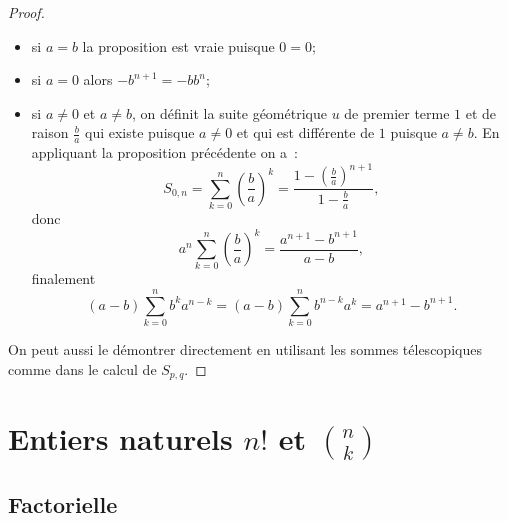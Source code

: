 \begin{proof}
  \begin{itemize}
  \item si \(a=b\) la proposition est vraie puisque \(0=0\);
  \item si \(a=0\) alors \(-b^{n+1}=-b b^n\);
  \item si \(a\neq 0\) et \(a\neq b\), on définit la suite géométrique \(u\) de premier terme \(1\) et de raison \(\frac{b}{a}\) qui existe puisque \(a\neq 0\) et qui est différente de \(1\) puisque \(a\neq b\). En appliquant la proposition précédente on a~: 
\begin{equation}
  S_{0,n}=\sum_{k=0}^n\left(\frac{b}{a}\right)^k=\frac{1-\left(\frac{b}{a}\right)^{n+1}}{1-\frac{b}{a}},
\end{equation}
donc
\begin{equation}
  a^n \sum_{k=0}^n\left(\frac{b}{a}\right)^k = \frac{a^{n+1}-b^{n+1}}{a-b},
\end{equation}
finalement
\begin{equation}
  (a-b)\sum_{k=0}^n b^ka^{n-k}=(a-b)\sum_{k=0}^n b^{n-k}a^{k}=a^{n+1}-b^{n+1}.
\end{equation}
\end{itemize}
On peut aussi le démontrer directement en utilisant les sommes télescopiques comme dans le calcul de \(S_{p,q}\).
\end{proof}

\section{Entiers naturels \(n!\) et \(\binom{n}{k}\)}

\subsection{Factorielle}

